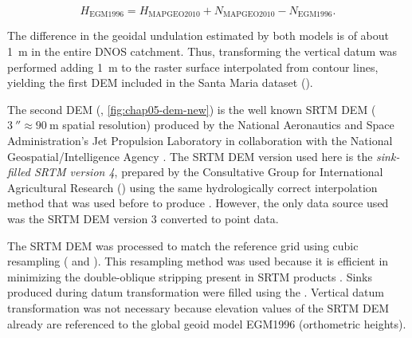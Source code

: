 \begin{equation}
 H_{\text{EGM1996}} = H_{\text{MAPGEO2010}} + N_{\text{MAPGEO2010}} - N_{\text{EGM1996}}.
\end{equation}

\noindent The difference in the geoidal undulation estimated by both models is of about \SI{1}{\m} in the 
entire DNOS catchment. Thus, transforming the vertical datum was performed adding \SI{1}{\m} to the raster 
surface interpolated from contour lines, yielding the first DEM included in the Santa Maria dataset 
(\demNew{}).

The second DEM (\demOld{}, \autoref{fig:chap05-dem-new}) is the well known SRTM DEM ($\SI{3}{\arcsecond} 
\approx \SI{90}{\m}$ spatial resolution) produced by the National Aeronautics and Space Administration’s Jet 
Propulsion Laboratory in collaboration with the National Geospatial\-/Intelligence Agency 
\cite{RodriguezEtAl2006}. The SRTM DEM version used here is the \emph{sink-filled SRTM version \num{4}}, 
prepared by the Consultative Group for International Agricultural Research (\cgiar) using the same 
hydrologically correct interpolation method that was used before to produce \demNew{} \cite{ReuterEtAl2007, 
JarvisEtAl2008}. However, the only data source used was the SRTM DEM version 3 converted to point data.

The SRTM DEM was processed to match the reference grid using cubic resampling ( and 
). This resampling method was used because it is efficient in minimizing the 
double-oblique stripping present in SRTM products \cite{Samuel-RosaEtAl2013c}. Sinks produced during datum 
transformation were filled using the . Vertical datum transformation was not necessary 
because elevation values of the SRTM DEM already are referenced to the global geoid model EGM1996 
(orthometric heights).

